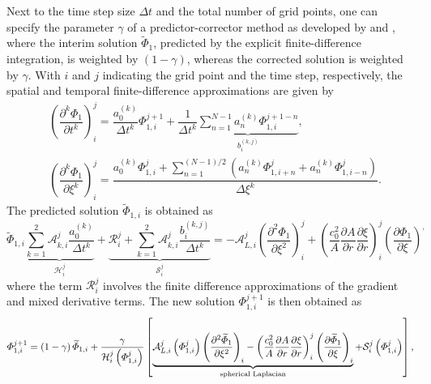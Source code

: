 Next to the time step size $\Delta t$ and the total number of grid points, one can specify the parameter $\gamma$ of a predictor-corrector method as developed by \citet{Dey_and_Dey_1983} and \citet{Nascimento_et_al_2010}, where the interim solution $\widetilde{\Phi}_1$, predicted by the explicit finite-difference integration, is weighted by $\left(1-\gamma\right)$, whereas the corrected solution is weighted by $\gamma$. With $i$ and $j$ indicating the grid point and the time step, respectively, the spatial and temporal finite-difference approximations are given by
\begin{align}
&\left(\dfrac{\partial^k \Phi_1}{\partial t^k}\right)^{j}_{i}
=
\dfrac{a_0^{\left(k\right)}}{\Delta t^k} \Phi^{j+1}_{1,i}
+
\dfrac{1}{\Delta t^k}\underbrace{\sum_{n=1}^{N-1} a_n^{\left(k\right)}\Phi^{j+1-n}_{1,i}
}_{b^{\left(k,j\right)}_i},
\label{eq:fddt_compact} \\
& \left(\dfrac{\partial^k \Phi_1}{\partial \xi^k}\right)^{j}_{i}
=
\dfrac{\displaystyle a_0^{\left(k\right)}\Phi^{j}_{1,i} + \sum_{n=1}^{\left(N-1\right)/2} \left( a_n^{\left(k\right)}\Phi^{j}_{1,i+n} + a_{n}^{\left(k\right)}\Phi^{j}_{1,i-n}\right)}{\Delta\xi^k}.
\label{eq:fddxi_compact}
\end{align}
The predicted solution $\widetilde{\Phi}_{1,i}$ is obtained as
\begin{equation}
\widetilde{\Phi}_{1,i}\underbrace{\sum_{k=1}^2\mathcal{A}_{k,i}^j \dfrac{a_0^{\left(k\right)}}{\Delta t^k}}_{\mathcal{H}^j_i}
+
\underbrace{\mathcal{R}^j_i
+
\sum_{k=1}^2\mathcal{A}_{k,i}^j \dfrac{b^{\left(k,j\right)}_i}{\Delta t^k}}_{\mathcal{S}^j_i}
=
- \mathcal{A}^j_{L,i}\left(\dfrac{\partial^2 \Phi_1}{\partial \xi^2}\right)^j_i + \left(\dfrac{c_0^2}{A}\dfrac{\partial A}{\partial r} \dfrac{\partial \xi}{\partial r}\right)^j_i\left(\dfrac{\partial \Phi_1}{\partial \xi}\right)^,
\label{eq:discreteEqn}
\end{equation}
where the term $\mathcal{R}_i^j$ involves the finite difference approximations of the gradient and mixed derivative terms. The new solution $\Phi^{j+1}_{1,i}$ is then obtained as
\begin{equation}
\Phi^{j+1}_{1,i} = \left(1-\gamma\right)\widetilde{\Phi}_{1,i} + \dfrac{\gamma}{\mathcal{H}^j_i\left(\Phi_{1,i}^{j}\right)}\left[\underbrace{\mathcal{A}^j_{L,i}\left(\Phi_{1,i}^{j}\right)\left(\dfrac{\partial^2\widetilde{\Phi}_1}{\partial \xi^2}\right)_i - \left(\dfrac{c_0^2}{A}\dfrac{\partial A}{\partial r} \dfrac{\partial \xi}{\partial r}\right)^j_i\left(\dfrac{\partial \widetilde{\Phi}_1}{\partial \xi}\right)_i}_{\textnormal{spherical Laplacian}} + \mathcal{S}^j_i\left(\Phi_{1,i}^{j}\right)\right],
\label{eq:corrector}
\end{equation}
